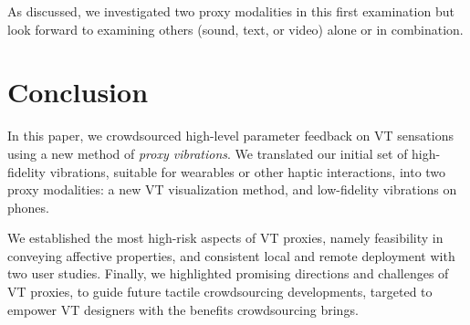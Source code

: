     As discussed, we investigated two proxy modalities in this first examination but look forward to examining others (sound, text, or video) alone or in combination.
        

      
\section{Conclusion}
In this paper, we crowdsourced high-level parameter feedback on VT sensations using a new method of \emph{proxy vibrations}.
We translated our initial set of high-fidelity vibrations, suitable for wearables or other haptic interactions, into two proxy modalities: a new VT visualization method, and low-fidelity vibrations on phones.

We established the most high-risk aspects of VT proxies, namely feasibility in conveying affective properties, and consistent local and remote deployment with two user studies.
Finally, we highlighted promising directions and challenges of VT proxies, to guide
future tactile crowdsourcing developments, targeted to empower VT designers with the benefits crowdsourcing brings.




\endinput
